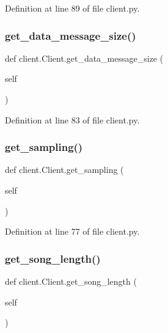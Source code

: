 Definition at line 89 of file client.\+py.

\mbox{\label{classclient_1_1_client_aa20f7f8ab952191d709158a5bc5e33cb}} 
\subsubsection{\texorpdfstring{get\_data\_message\_size()}{get\_data\_message\_size()}}
{\footnotesize\ttfamily def client.\+Client.\+get\+\_\+data\+\_\+message\+\_\+size (\begin{DoxyParamCaption}\item[{}]{self }\end{DoxyParamCaption})}



Definition at line 83 of file client.\+py.

\mbox{\label{classclient_1_1_client_a1ea688c381f714976f489873002bac8c}} 
\subsubsection{\texorpdfstring{get\_sampling()}{get\_sampling()}}
{\footnotesize\ttfamily def client.\+Client.\+get\+\_\+sampling (\begin{DoxyParamCaption}\item[{}]{self }\end{DoxyParamCaption})}



Definition at line 77 of file client.\+py.

\mbox{\label{classclient_1_1_client_a41a5b2936e0d2d529bbe83b3ee3c2a5f}} 
\subsubsection{\texorpdfstring{get\_song\_length()}{get\_song\_length()}}
{\footnotesize\ttfamily def client.\+Client.\+get\+\_\+song\+\_\+length (\begin{DoxyParamCaption}\item[{}]{self }\end{DoxyParamCaption})}



